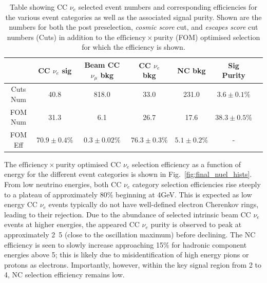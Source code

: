 \begin{table}
    \begin{tabular}{ccccccc}
                 & CC $\nu_{e}$ sig & Beam CC $\nu_{\mu}$ bkg & CC $\nu_{e}$ bkg & NC bkg        & Sig Purity     \\
        \midrule
        Cuts Num & 40.8             & 818.0                   & 33.0             & 231.0         & $3.6\pm0.1\%$  \\
        FOM Num  & 31.3             & 6.1                     & 26.7             & 17.6          & $38.3\pm0.5\%$ \\
        \midrule
        FOM Eff  & $70.9\pm0.4\%$   & $0.3\pm0.02\%$          & $76.3\pm0.3\%$   & $5.1\pm0.2\%$ & -              \\
    \end{tabular}
    \caption[Table showing CC $\nu_{e}$ selected event numbers, efficiencies and signal purity.]
    {Table showing CC $\nu_{e}$ selected event numbers and corresponding efficiencies for the
        various event categories as well as the associated signal purity. Shown are the numbers
        for both the post preselection, \emph{cosmic score} cut, and \emph{escapes score} cut
        numbers (Cuts) in addition to the $\mathrm{efficiency}\times\mathrm{purity}$ (FOM)
        optimised selection for which the efficiency is shown.}
    \label{tab:nuel_selection}
\end{table}

The $\mathrm{efficiency}\times\mathrm{purity}$ optimised CC $\nu_{e}$ selection efficiency as a
function of energy for the different event categories is shown in Fig.~\ref{fig:final_nuel_hists}.
From low neutrino energies, both CC $\nu_{e}$ category selection efficiencies rise steeply to a
plateau of approximately 80\% beginning at \unit{4}{GeV}. This is expected as low energy CC
$\nu_{e}$ events typically do not have well-defined electron Cherenkov rings, leading to their
rejection. Due to the abundance of selected intrinsic beam CC $\nu_{e}$ events at higher energies,
the appeared CC $\nu_{e}$ purity is observed to peak at approximately \unit{2.5}{\GeV} (close to
the oscillation maximum) before declining. The NC efficiency is seen to slowly increase
approaching 15\% for hadronic component energies above \unit{5}{\GeV}; this is likely due to
misidentification of high energy pions or protons as electrons. Importantly, however, within the
key signal region from 2 to \unit{4}{\GeV}, NC selection efficiency remains low.

